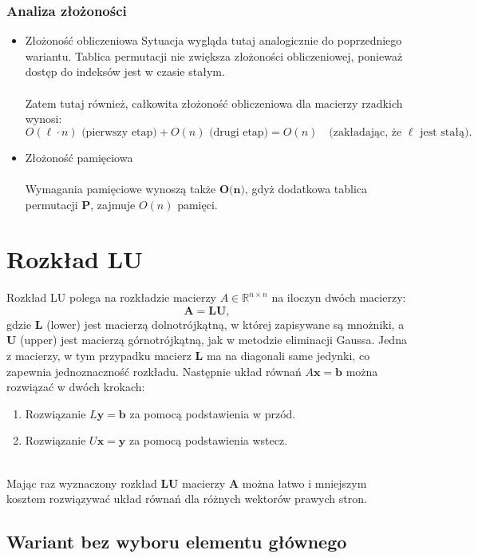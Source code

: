 \documentclass{article}
\begin{document}
\subsubsection{Analiza złożoności}
\begin{itemize}
    \item Złożoność obliczeniowa
    Sytuacja wygląda tutaj analogicznie do poprzedniego wariantu. Tablica permutacji nie zwiększa złożoności obliczeniowej, ponieważ dostęp do indeksów jest w czasie stałym. \\ \\
    Zatem tutaj również, całkowita złożoność obliczeniowa dla macierzy rzadkich wynosi:
\[
O(\ell \cdot n) \text{ (pierwszy etap)} + O(n) \text{ (drugi etap)} = O(n) \quad \text{(zakładając, że } \ell \text{ jest stałą)}.
\]
    \item Złożoność pamięciowa \\ \\
    Wymagania pamięciowe wynoszą także $\textbf{O(n)}$, gdyż  dodatkowa tablica permutacji $\mathbf{P}$, zajmuje $O(n)$ pamięci.
\end{itemize}

\section{Rozkład LU}
Rozkład LU polega na rozkładzie macierzy $A \in \mathbb{R}^{n \times n}$ na iloczyn dwóch macierzy:
\[
\mathbf{A} = \mathbf{LU},
\]
gdzie $\mathbf{L}$ (lower) jest macierzą dolnotrójkątną, w której zapisywane są mnożniki, a $\mathbf{U}$ (upper) jest macierzą górnotrójkątną, jak w metodzie eliminacji Gaussa. Jedna z macierzy, w tym przypadku macierz $\mathbf{L}$ ma na diagonali same jedynki, co zapewnia jednoznaczność rozkładu. Następnie układ równań $A \mathbf{x} = \mathbf{b}$ można rozwiązać w dwóch krokach:
\begin{enumerate}
    \item Rozwiązanie $L \mathbf{y} = \mathbf{b}$ za pomocą podstawienia w przód.
    \item Rozwiązanie $U \mathbf{x} = \mathbf{y}$ za pomocą podstawienia wstecz.
\end{enumerate}
\\ Mając raz wyznaczony rozkład $\mathbf{LU}$ macierzy $\mathbf{A}$ można łatwo i mniejszym kosztem rozwiązywać układ równań dla różnych wektorów prawych stron.

\subsection{Wariant bez wyboru elementu głównego}
\end{document}
